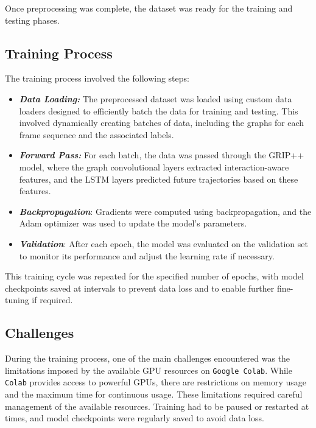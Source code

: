 Once preprocessing was complete, the dataset was ready for the training and testing phases.

\subsection{Training Process}

\tab The training process involved the following steps:

\begin{itemize}
    \item \textbf{\textit{Data Loading:}} The preprocessed dataset was loaded using custom data loaders designed to efficiently batch the data for training and testing. This involved dynamically creating batches of data, including the graphs for each frame sequence and the associated labels.
    \item \textbf{\textit{Forward Pass:}} For each batch, the data was passed through the GRIP++ model, where the graph convolutional layers extracted interaction-aware features, and the LSTM layers predicted future trajectories based on these features.
    \item \textbf{\textit{Backpropagation}}: Gradients were computed using backpropagation, and the Adam optimizer was used to update the model's parameters.
    \item \textbf{\textit{Validation}}: After each epoch, the model was evaluated on the validation set to monitor its performance and adjust the learning rate if necessary.
\end{itemize}

\tab This training cycle was repeated for the specified number of epochs, with model checkpoints saved at intervals to prevent data loss and to enable further fine-tuning if required.

\subsection{Challenges}

\tab During the training process, one of the main challenges encountered was the limitations imposed by the available GPU resources on \verb|Google Colab|. While \verb|Colab| provides access to powerful GPUs, there are restrictions on memory usage and the maximum time for continuous usage. These limitations required careful management of the available resources. Training had to be paused or restarted at times, and model checkpoints were regularly saved to avoid data loss.


